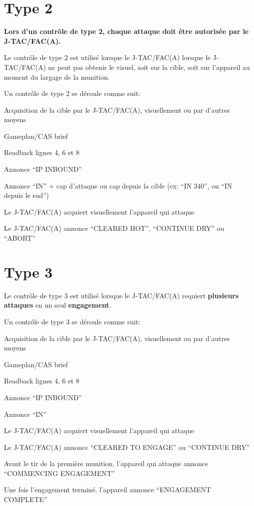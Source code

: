 \section{Type 2}
\e
    \item \textbf{Lors d’un contrôle de type 2, chaque attaque doit être autorisée par le J-TAC/FAC(A).}
    \item Le contrôle de type 2 est utilisé lorsque le J-TAC/FAC(A) lorsque le J-TAC/FAC(A) ne peut pas obtenir le visuel, soit sur la cible, soit sur l’appareil au moment du largage de la munition.
    \item Un contrôle de type 2 se déroule comme suit:
    \ee
        \item Acquisition de la cible par le J-TAC/FAC(A), visuellement ou par d’autres moyens
        \item Gameplan/CAS brief
        \item Readback lignes 4, 6 et 8
        \item Annonce “IP INBOUND”
        \item Annonce “IN” + cap d’attaque ou cap depuis la cible (ex: “IN 340”, ou “IN depuis le sud”)
        \item Le J-TAC/FAC(A) acquiert visuellement l’appareil qui attaque
        \item Le J-TAC/FAC(A) annonce “CLEARED HOT”, “CONTINUE DRY” ou “ABORT”
    \ed
\ed

\section{Type 3}
\e
    \item Le contrôle de type 3 est utilisé lorsque le J-TAC/FAC(A) requiert \textbf{plusieurs attaques} en un seul \textbf{engagement}.
    \item Un contrôle de type 3 se déroule comme suit:
    \ee
        \item Acquisition de la cible par le J-TAC/FAC(A), visuellement ou par d’autres moyens
        \item Gameplan/CAS brief
        \item Readback lignes 4, 6 et 8
        \item Annonce “IP INBOUND”
        \item Annonce “IN”
        \item Le J-TAC/FAC(A) acquiert visuellement l’appareil qui attaque
        \item Le J-TAC/FAC(A) annonce “CLEARED TO ENGAGE” ou “CONTINUE DRY”
        \item Avant le tir de la première munition, l’appareil qui attaque annonce “COMMENCING ENGAGEMENT”
        \item Une fois l’engagement terminé, l’appareil annonce “ENGAGEMENT COMPLETE”
    \ed
\ed

